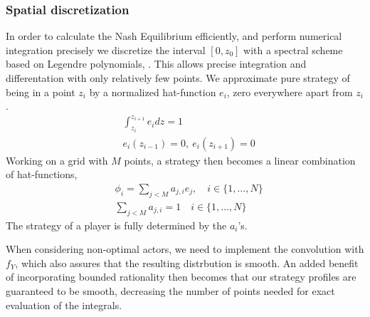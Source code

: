 
\subsubsection*{Spatial discretization}
In order to calculate the Nash Equilibrium efficiently, and perform numerical integration precisely we discretize the interval $[0,z_0]$ with a spectral scheme based on Legendre polynomials, \citep{kopriva2009implementing}. This allows precise integration and differentation with only relatively few points.
We approximate pure strategy of being in a point $z_i$  by a normalized hat-function $e_i$, zero everywhere apart from $z_i$.
\begin{align*}
	& \int_{z_i}^{z_{i+1}} e_i dz = 1 \\
	&e_i(z_{i-1}) = 0,~ e_i(z_{i+1}) = 0
\end{align*}
Working on a grid with $M$ points, a strategy then becomes a linear combination of hat-functions,
\begin{align*}
  &\phi_{i} = \sum_{j<M} a_{j,i} e_j, \quad i\in \{1,\dots, N\} \\
  &\sum_{j<M} a_{j,i} = 1 \quad i\in \{1,\dots, N\}
\end{align*}
The strategy of a player is fully determined by the $a_i$'s.

When considering non-optimal actors, we need to implement the convolution with $f_Y$, which also assures that the resulting distrbution is smooth. An added benefit of incorporating bounded rationality then becomes that our strategy profiles are guaranteed to be smooth, decreasing the number of points needed for exact evaluation of the integrals.


